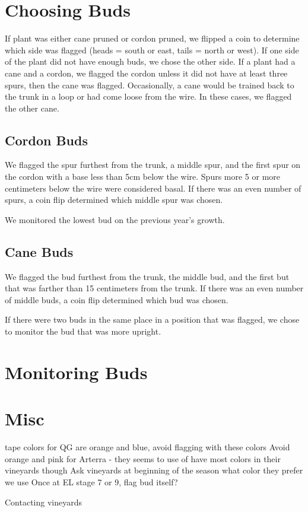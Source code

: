\documentclass[11pt,letter]{article}
\begin{document}
\section{Choosing Buds}

If plant was either cane pruned or cordon pruned, we flipped a coin to determine which side was flagged (heads = south or east, tails = north or west). If one side of the plant did not have enough buds, we chose the other side. If a plant had a cane and a cordon, we flagged the cordon unless it did not have at least three spurs, then the cane was flagged. Occasionally, a cane would be trained back to the trunk in a loop or had come loose from the wire. In these cases, we flagged the other cane.

\subsection{Cordon Buds}

We flagged the spur furthest from the trunk, a middle spur, and the first spur on the cordon with a base less than 5cm below the wire. Spurs more 5 or more centimeters below the wire were considered basal. If there was an even number of spurs, a coin flip determined which middle spur was chosen.

We monitored the lowest bud on the previous year's growth.

\subsection{Cane Buds}

We flagged the bud furthest from the trunk, the middle bud, and the first but that was farther than 15 centimeters from the trunk. If there was an even number of middle buds, a coin flip determined which bud was chosen.

If there were two buds in the same place in a position that was flagged, we chose to monitor the bud that was more upright.

\section{Monitoring Buds}

\section{Misc}
tape colors for QG are orange and blue, avoid flagging with these colors
Avoid orange and pink for Arterra - they seems to use of have most colors in their vineyards though
Ask vineyards at beginning of the season what color they prefer we use
Once at EL stage 7 or 9, flag bud itself?

Contacting vineyards 
\end{document}
